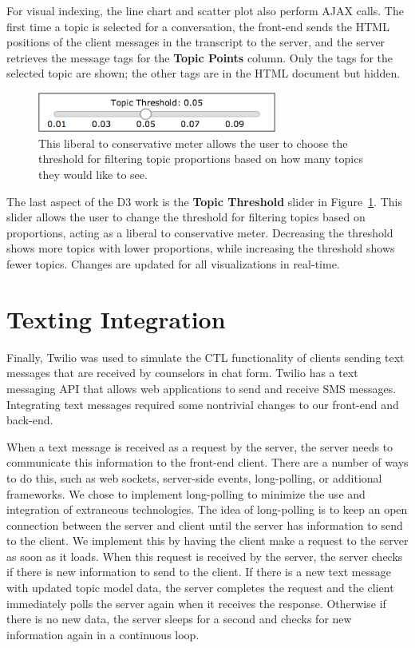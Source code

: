 For visual indexing, the line chart and scatter plot also perform AJAX calls.
The first time a topic is selected for a conversation, the front-end sends the HTML
positions of the client messages in the transcript to the server, and the server retrieves
the message tags for the \textbf{Topic Points} column. Only the tags for the selected topic
are shown; the other tags are in the HTML document but hidden.

\begin{figure}[h]
  \centering
    \includegraphics[width=0.7\textwidth]{slider.png}
  \caption{This liberal to conservative meter allows the user to choose the threshold
  for filtering topic proportions based on how many topics they would like to see.}
  \label{slider}
\end{figure}

The last aspect of the D3 work is the \textbf{Topic Threshold} slider in Figure~\ref{slider}. This
slider allows the user to change the threshold for filtering topics based on proportions,
acting as a liberal to conservative meter. Decreasing the threshold shows more topics
with lower proportions, while increasing the threshold shows fewer topics. Changes
are updated for all visualizations in real-time.

\section{Texting Integration}

Finally, Twilio \cite{twilio} was used to simulate the CTL functionality of clients sending
text messages that are received by counselors in chat form. Twilio has a text messaging
API that allows web applications to send and receive SMS messages. Integrating text
messages required some nontrivial changes to our front-end and back-end.

When a text message is received as a request by the server, the server needs to
communicate this information to the front-end client. There are a number of ways to
do this, such as web sockets, server-side events, long-polling, or additional
frameworks. We chose to implement long-polling to minimize the use and integration
of extraneous technologies. The idea of long-polling is to keep an open connection
between the server and client until the server has information to send to the client.
We implement this by having the client make a request to the server as soon as it
loads. When this request is received by the server, the server checks if there is new
information to send to the client. If there is a new text message with updated topic
model data, the server completes the request and the client immediately polls the
server again when it receives the response. Otherwise if there is no new data, the
server sleeps for a second and checks for new information again in a continuous loop.

